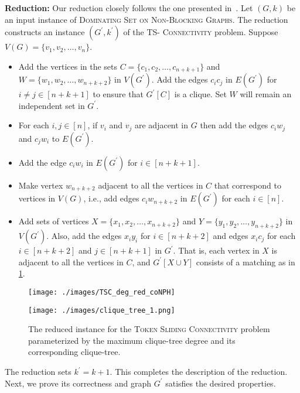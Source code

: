 \noindent\textbf{Reduction:} 
Our reduction closely follows the one presented 
in~\cite{DBLP:conf/wg/BonamyB17}.
Let $(G,k)$ be an input instance of 
\textsc{Dominating Set on Non-Blocking Graphs}. 
The reduction constructs an instance 
$(G^\prime,k^\prime)$ of the \textsc{TS- Connectivity} problem.
Suppose $V(G) = \{v_1,v_2,\ldots,v_n\}$. 
\begin{itemize}
\item Add the vertices in the sets $C=\{c_1,c_2,\ldots,c_{n+k+1}\}$ 
and $W=\{w_1,w_2,\ldots,w_{n+k+2}\}$ in $V(G^\prime)$.
Add the edges $c_ic_j$ in $E(G^\prime)$ for $i\neq j\in [n+k+1]$
to ensure that $G^\prime[C]$ is a clique.
Set $W$ will remain an independent set in $G^{\prime}$.
\item For each $i,j\in [n]$, if $v_i$ and $v_j$ are adjacent in $G$ then add 
the edges $c_iw_j$ and $c_jw_i$ to $E(G^\prime)$.
\item Add the edge $c_iw_i$ in $E(G^\prime)$ for $i \in [n+k+1]$. 
\item Make vertex $w_{n+k+2}$ adjacent to all the vertices in $C$
that correspond to vertices in $V(G)$, i.e., 
add edges $c_iw_{n+k+2}$ in $E(G^\prime)$ for each $i\in [n]$.
\item Add sets of vertices $X=\{x_1,x_2,\ldots,x_{n+k+2}\}$ 
and $Y=\{y_1,y_2,\ldots,y_{n+k+2}\}$ in $V(G^\prime)$.
Also, add the edges $x_iy_i$ for $i\in[n+k+2]$ and edges 
$x_ic_j$ for each $i\in [n+k+2]$ and $j\in [n+k+1]$ in $G^\prime$.
That is, each vertex in $X$ is adjacent to all the vertices in $C$,
and $G^\prime[X \cup Y]$ consists of a matching as in 
\cref{TSC_deg_coNPH}. 
\end{itemize}
\begin{figure}[t]
    \centering
    \texttt{[image: ./images/TSC\_deg\_red\_coNPH]}

    \texttt{[image: ./images/clique\_tree\_1.png]}
    \caption{The reduced instance for the \textsc{Token Sliding Connectivity} problem parameterized by the maximum clique-tree degree and its corresponding clique-tree.}
    \label{TSC_deg_coNPH}
\end{figure}

The reduction sets $k^\prime=k+1$. 
This completes the description of the reduction.  
Next, we prove its correctness and graph $G^{\prime}$ satisfies
the desired properties.

